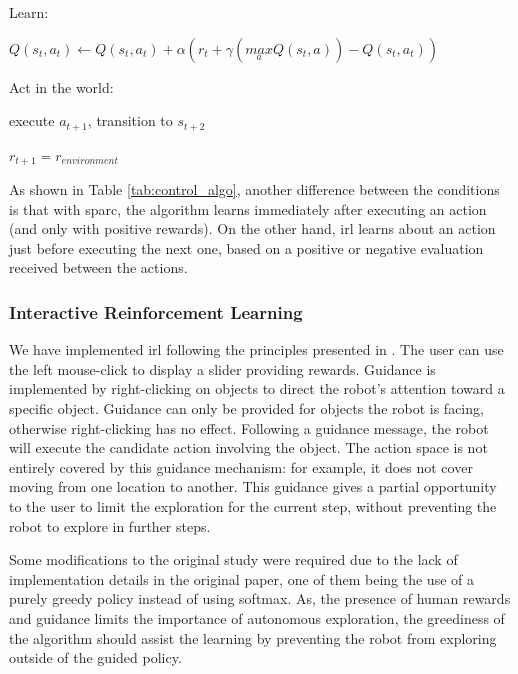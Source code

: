 \begin{table}
\begin{minipage}[t]{0.5\textwidth}
\begin{algorithm}[H]
\begin{minipage}{0.9\linewidth}
{		\nosemic Learn:
		 
		\pushline\dosemic$Q(s_{t},a_{t}) \leftarrow Q(s_{t},a_{t}) + \alpha (r_{t}+\gamma (\underset{a}{max} Q(s_{t},a))-Q(s_{t},a_{t}))$
		
		\popline \nosemic Act in the world:
		
		\pushline\dosemic execute $a_{t+1}$, transition to $s_{t+2}$
		
		\popline$r_{t+1} = r_{environment}$
	}
	\end{minipage}
	\end{algorithm}
\end{minipage}
\label{tab:control_algo}
\end{table}

As shown in Table \ref{tab:control_algo}, another difference between the conditions is that with \gls{sparc}, the algorithm learns immediately after executing an action (and only with positive rewards). On the other hand, \gls{irl} learns about an action just before executing the next one, based on a positive or negative evaluation received between the actions.

\subsubsection{Interactive Reinforcement Learning}

We have implemented \gls{irl} following the principles presented in \cite{thomaz2008teachable}. The user can use the left mouse-click to display a slider providing rewards. Guidance is implemented by right-clicking on objects to direct the robot's attention toward a specific object. Guidance can only be provided for objects the robot is facing, otherwise right-clicking has no effect. Following a guidance message, the robot will execute the candidate action involving the object. The action space is not entirely covered by this guidance mechanism: for example, it does not cover moving from one location to another. This guidance gives a partial opportunity to the user to limit the exploration for the current step, without preventing the robot to explore in further steps.

Some modifications to the original study were required due to the lack of implementation details in the original paper, one of them being the use of a purely greedy policy instead of using softmax. As, the presence of human rewards and guidance limits the importance of autonomous exploration, the greediness of the algorithm should assist the learning by preventing the robot from exploring outside of the guided policy. 

